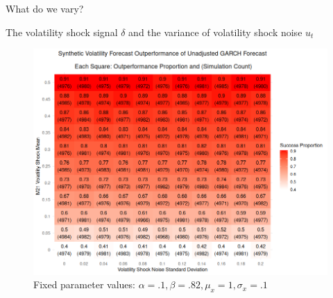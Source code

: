 \documentclass[9pt]{beamer}
\theoremstyle{definition}
\begin{document}
\begin{frame}
    \fontsize{8pt}{9pt}
    What do we vary?\\

    \bigbreak
    
    The volatility shock signal $\delta$ and the variance of volatility shock noise $u_{t}$\\
    
    \begin{figure}[h!]
      \begin{center}
        \includegraphics[scale=.29]{simulation_plots/standard_simulation_alpha_.1_beta_.82.png}
        \caption{Fixed parameter values: $\alpha = .1, \beta = .82, \mu_{x} = 1, \sigma_{x} = .1$}\label{fig:heavy_beta}
      \end{center}
      \end{figure}

\end{frame}
\end{document}
